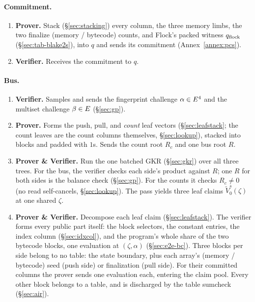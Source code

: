 \paragraph{Commitment.}

\begin{enumerate}
\item \textbf{Prover.} Stack (\S\ref{sec:stacking}) every column, the three memory limbs, the two finalize (memory / bytecode) counts, and Flock's packed witness $q_{\mathrm{flock}}$ (\S\ref{sec:tab-blake2s}), into $q$ and sends its commitment (Annex~\ref{annex:pcs}).
\item \textbf{Verifier.} Receives the commitment to $q$.
\end{enumerate}

\paragraph{Bus.}

\begin{enumerate}
\item \textbf{Verifier.} Samples and sends the fingerprint challenge $\alpha\in E^{4}$ and the multiset challenge $\beta\in E$ (\S\ref{sec:gp}).
\item \textbf{Prover.} Forms the push, pull, and \emph{count} leaf vectors (\S\ref{sec:leafstack}; the count leaves are the count columns themselves, \S\ref{sec:lookup}), stacked into blocks and padded with $1$s. Sends the count root $R_c$ and one bus root $R$.
\item \textbf{Prover \& Verifier.} Run the one batched GKR (\S\ref{sec:gkr}) over all three trees. For the bus, the verifier checks each side's product against $R$; one $R$ for both sides is the balance check (\S\ref{sec:gp}). For the counts it checks $R_c\neq0$ (no read self-cancels, \S\ref{sec:lookup}). The pass yields three leaf claims $\widetilde V^{s}_0(\zeta)$ at one shared $\zeta$.
\item \textbf{Prover \& Verifier.} Decompose each leaf claim (\S\ref{sec:leafstack}). The verifier forms every public part itself: the block selectors, the constant entries, the index column (\S\ref{sec:idxcol}), and the program's whole share of the two bytecode blocks, one evaluation at $(\zeta,\alpha)$ (\S\ref{sec:e2e-bc}). Three blocks per side belong to no table: the state boundary, plus each array's (memory / bytecode) seed (push side) or finalization (pull side). For their committed columns the prover sends one evaluation each, entering the claim pool. Every other block belongs to a table, and is discharged by the table sumcheck (\S\ref{sec:air}).
\end{enumerate}


